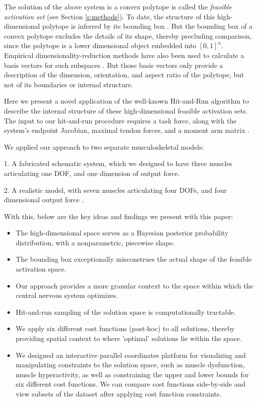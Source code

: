 The solution of the above system is a convex polytope is called the \emph{feasible activation set} (see Section \ref{s:methods}). To date, the structure of this high-dimensional polytope is inferred by its bounding box  \cite{kutch2011muscle,sohn2013cat_bounding_box,Valero-Cuevas2015high-dimensional}.  But the bounding box of a convex polytope excludes the details of its shape, thereby precluding comparison, since the polytope is a lower dimensional object embedded into $[0,1]^n$.  Empirical dimensionality-reduction methods have also been used to calculate a basis vectors for such subspaces \cite{Clewley2008Estimating,davella2005shared,krishnamoorthy2003muscle}. But those basis  vectors only provide a description of the dimension, orientation, and aspect ratio of the polytope, but not of its boundaries or internal  structure.

Here we present a novel application of the well-known Hit-and-Run algorithm \cite{smith1984efficient} to describe the internal structure of these high-dimensional feasible activation sets. The input to our hit-and-run procedure requires a task force, along with the system's endpoint Jacobian, maximal tendon forces, and a moment arm matrix \cite{Valero-Cuevas2009mathematical}.

We applied our approach to two separate musculoskeletal models:

1. A fabricated schematic system, which we designed to have three muscles articulating one DOF, and one dimension of output force.

2. A realistic model, with seven muscles articulating four DOFs, and four dimensional output force \cite{Valero-Cuevas1998Large}.

With this, below are the key ideas and findings we present with this paper:

\begin{itemize}
\item {The high-dimensional space serves as a Bayesian posterior probability distribution, with a nonparametric, piecewise shape.}
\item {The bounding box exceptionally misconstrues the actual shape of the feasible activation space.}
\item {Our approach provides a more granular context to the space within which the central nervous system optimizes.}
\item {Hit-and-run sampling of the solution space is computationally tractable.}%
\item {We apply six different cost functions (post-hoc) to all solutions, thereby providing spatial context to where 'optimal' solutions lie within the space.}
\item {We designed an interactive parallel coordinates platform for visualizing and manipulating constraints to the solution space, such as muscle dysfunction, muscle hyperactivity, as well as constraining the upper and lower bounds for six different cost functions. We can compare cost functions side-by-side and view subsets of the dataset after applying cost function constraints. }
\end{itemize}

